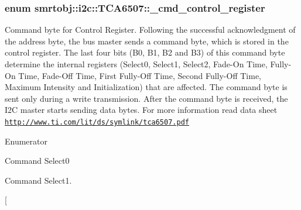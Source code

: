 \subsubsection[{\+\_\+cmd\+\_\+control\+\_\+register}]{\setlength{\rightskip}{0pt plus 5cm}enum {\bf smrtobj\+::i2c\+::\+T\+C\+A6507\+::\+\_\+cmd\+\_\+control\+\_\+register}}\label{classsmrtobj_1_1i2c_1_1_t_c_a6507_a2b771c2f4975065352874dc67f7d701d}
Command byte for Control Register. Following the successful acknowledgment of the address byte, the bus master sends a command byte, which is stored in the control register. The last four bits (B0, B1, B2 and B3) of this command byte determine the internal registers (Select0, Select1, Select2, Fade-\/\+On Time, Fully-\/\+On Time, Fade-\/\+Off Time, First Fully-\/\+Off Time, Second Fully-\/\+Off Time, Maximum Intensity and Initialization) that are affected. The command byte is sent only during a write transmission. After the command byte is received, the I2\+C master starts sending data bytes. For more information read data sheet \href{http://www.ti.com/lit/ds/symlink/tca6507.pdf}{\tt http\+://www.\+ti.\+com/lit/ds/symlink/tca6507.\+pdf} \begin{Desc}
\item[Enumerator]\par
\begin{description}
\item[{\em 
\hypertarget{classsmrtobj_1_1i2c_1_1_t_c_a6507_a2b771c2f4975065352874dc67f7d701dac115aeb0ec43a2d83c19d4e7ebfcc019}{}S\+E\+L\+E\+C\+T0\label{classsmrtobj_1_1i2c_1_1_t_c_a6507_a2b771c2f4975065352874dc67f7d701dac115aeb0ec43a2d83c19d4e7ebfcc019}
}]\textquotesingle{}Command Select0\textquotesingle{} \item[{\em 
\hypertarget{classsmrtobj_1_1i2c_1_1_t_c_a6507_a2b771c2f4975065352874dc67f7d701da80e0d021063c8c95043a18096a6f55f6}{}S\+E\+L\+E\+C\+T1\label{classsmrtobj_1_1i2c_1_1_t_c_a6507_a2b771c2f4975065352874dc67f7d701da80e0d021063c8c95043a18096a6f55f6}
}]Command \textquotesingle{}Select1\textquotesingle{}. \item[{\em 
}
\end{description}
\end{Desc}
